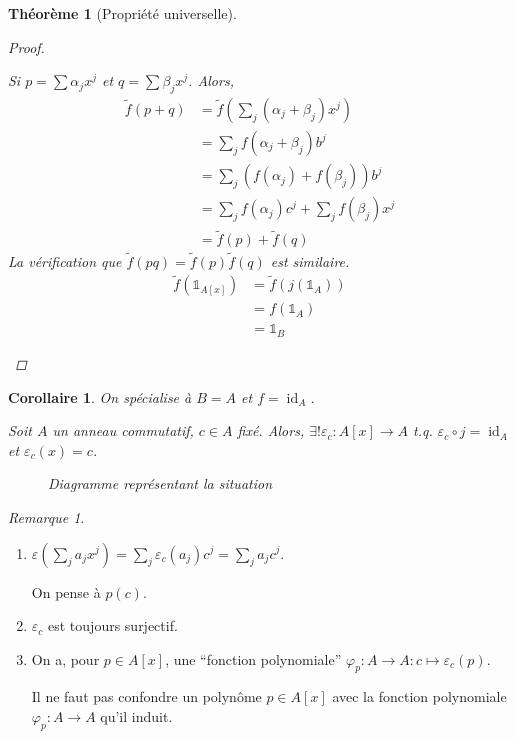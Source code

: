 \documentclass{report}
\newtheorem*{thm}{Th\'eor\`eme}
\newtheorem*{coro}{Corollaire}
\theoremstyle{definition}
\theoremstyle{remark}
\newtheorem*{rmq}{Remarque}
\def\id{\mathds{1}}
\def\iden{\operatorname{id}}
\begin{document}
\begin{thm}[Propri\'et\'e universelle]
\begin{proof}
\begin{enumerate}
				Si $p=\sum \alpha_jx^j$ et $q=\sum \beta_jx^j$. Alors,
				\begin{align*}
					\widetilde{f}(p+q)&= \widetilde{f}\left(\sum_j(\alpha_j+\beta_j)x^j\right)\\
					&= \sum_jf(\alpha_j+\beta_j)b^j\\
					&= \sum_j(f(\alpha_j)+f(\beta_j))b^j\\
					&= \sum_jf(\alpha_j)c^j+\sum_jf(\beta_j)x^j\\
					&= \widetilde{f}(p)+\widetilde{f}(q)
				\end{align*}
				La v\'erification que $\widetilde{f}(pq) = \widetilde{f}(p)\widetilde{f}(q)$ est similaire.
				\begin{align*}
					\widetilde{f}(\id_{A[x]})&= \widetilde{f}(j(\id_A))\\
					&= f(\id_A)\\
					&= \id_B
				\end{align*}
			\end{enumerate}
		\end{proof}
	\end{thm}

	\begin{coro}
		On sp\'ecialise \`a $B=A$ et $f=\iden_A$.

		Soit $A$ un anneau commutatif, $c\in A$ fix\'e. Alors, $\exists!\varepsilon_c:A[x]\to A$ t.q. $\varepsilon_c\circ j=\iden_A$ et $\varepsilon_c(x)=c$.
		\begin{figure}[h]
			\centering
			\caption{Diagramme repr\'esentant la situation}
		\end{figure}
	\end{coro}

	\begin{rmq}
		\begin{enumerate}
			\item $\varepsilon\left(\sum_ja_jx^j\right) = \sum_j\varepsilon_c(a_j)c^j = \sum_ja_jc^j$.

			On pense \`a $p(c)$.
			\item $\varepsilon_c$ est toujours surjectif.
			\item On a, pour $p\in A[x]$, une ``fonction polynomiale'' $\varphi_p : A\to A : c\mapsto\varepsilon_c(p)$.

			Il ne faut pas confondre un polyn\^ome $p\in A[x]$ avec la fonction polynomiale $\varphi_p:A\to A$ qu'il induit.
		\end{enumerate}
	\end{rmq}
\end{document}
